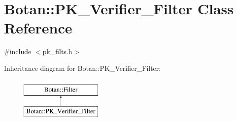 \hypertarget{classBotan_1_1PK__Verifier__Filter}{\section{Botan\-:\-:P\-K\-\_\-\-Verifier\-\_\-\-Filter Class Reference}
\label{classBotan_1_1PK__Verifier__Filter}
}


{\ttfamily \#include $<$pk\-\_\-filts.\-h$>$}

Inheritance diagram for Botan\-:\-:P\-K\-\_\-\-Verifier\-\_\-\-Filter\-:\begin{figure}[H]
\begin{center}
\leavevmode
\includegraphics[height=2.000000cm]{classBotan_1_1PK__Verifier__Filter}
\end{center}
\end{figure}
